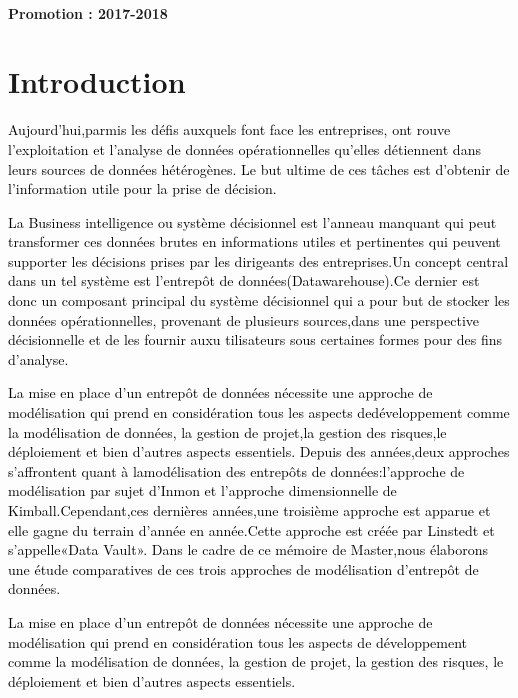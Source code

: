 \documentclass[a4paper,12pt]{report}
\begin{document}
		~~\\
		\vskip 0.3in
		\begin{center}
			\vspace{0.3cm} \textbf{Promotion : 2017-2018}
		\end{center}
	\newpage
		
		
		
		
		\section*{Introduction}
\vspace{1cm}
    



\textcolor{black}{Aujourd’hui,parmis les défis auxquels font face les entreprises, ont rouve l’exploitation et l’analyse de données opérationnelles qu’elles détiennent dans leurs sources de données hétérogènes. Le but ultime de ces tâches est d’obtenir de l’information utile pour la prise de décision.
}

 \textcolor{black}{La Business intelligence ou système décisionnel est l’anneau manquant qui peut transformer ces données brutes en informations utiles et pertinentes qui peuvent supporter les décisions prises par les dirigeants des entreprises.Un concept central dans un tel système est l’entrepôt de données(Datawarehouse).Ce dernier est donc un composant principal du système décisionnel qui a pour but de stocker les données opérationnelles, provenant de plusieurs sources,dans une perspective décisionnelle et de les fournir auxu tilisateurs sous certaines formes pour des fins d’analyse.
 }


\textcolor{black}{La mise en place d’un entrepôt de données nécessite une approche de modélisation qui prend en considération tous les aspects dedéveloppement comme la modélisation de données, la gestion de projet,la gestion des risques,le déploiement et bien d’autres aspects essentiels.
Depuis des années,deux approches s’affrontent quant à lamodélisation des entrepôts de données:l’approche de modélisation par sujet d’Inmon et l’approche dimensionnelle de Kimball.Cependant,ces dernières années,une troisième approche est apparue et elle gagne du terrain d’année en année.Cette approche est créée par Linstedt et s’appelle«Data Vault».
Dans le cadre de ce mémoire de Master,nous élaborons une étude comparatives de ces trois approches de modélisation d’entrepôt de données.}


\textcolor{black}{La mise en place d’un entrepôt de données nécessite une approche de modélisation qui
prend en considération tous les aspects de développement comme la modélisation de données, la
gestion de projet, la gestion des risques, le déploiement et bien d’autres aspects essentiels.}
\end{document}
